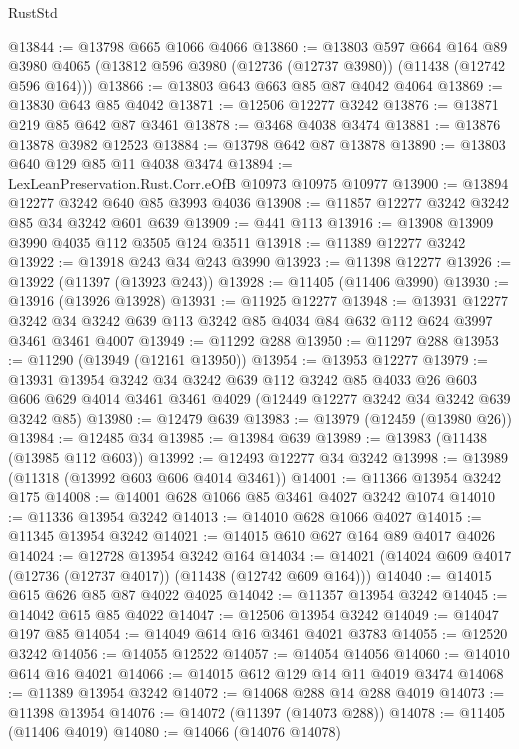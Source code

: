 \begin{lexlean}{RustStd}
\begin{coremodule}
@13844 := @13798 @665 @1066 @4066
@13860 := @13803
    @597
    @664
    @164
    @89
    @3980
    @4065
    (@13812 @596 @3980 (@12736 (@12737 @3980)) (@11438 (@12742 @596 @164)))
@13866 := @13803 @643 @663 @85 @87 @4042 @4064
@13869 := @13830 @643 @85 @4042
@13871 := @12506 @12277 @3242
@13876 := @13871 @219 @85 @642 @87 @3461
@13878 := @3468 @4038 @3474
@13881 := @13876 @13878 @3982 @12523
@13884 := @13798 @642 @87 @13878
@13890 := @13803 @640 @129 @85 @11 @4038 @3474
@13894 := LexLeanPreservation.Rust.Corr.eOfB @10973 @10975 @10977
@13900 := @13894 @12277 @3242 @640 @85 @3993 @4036
@13908 := @11857 @12277 @3242 @3242 @85 @34 @3242 @601 @639
@13909 := @441 @113
@13916 := @13908 @13909 @3990 @4035 @112 @3505 @124 @3511
@13918 := @11389 @12277 @3242
@13922 := @13918 @243 @34 @243 @3990
@13923 := @11398 @12277
@13926 := @13922 (@11397 (@13923 @243))
@13928 := @11405 (@11406 @3990)
@13930 := @13916 (@13926 @13928)
@13931 := @11925 @12277
@13948 := @13931
    @12277
    @3242
    @34
    @3242
    @639
    @113
    @3242
    @85
    @4034
    @84
    @632
    @112
    @624
    @3997
    @3461
    @3461
    @4007
@13949 := @11292 @288
@13950 := @11297 @288
@13953 := @11290 (@13949 (@12161 @13950))
@13954 := @13953 @12277
@13979 := @13931
    @13954
    @3242
    @34
    @3242
    @639
    @112
    @3242
    @85
    @4033
    @26
    @603
    @606
    @629
    @4014
    @3461
    @3461
    @4029
    (@12449 @12277 @3242 @34 @3242 @639 @3242 @85)
@13980 := @12479 @639
@13983 := @13979 (@12459 (@13980 @26))
@13984 := @12485 @34
@13985 := @13984 @639
@13989 := @13983 (@11438 (@13985 @112 @603))
@13992 := @12493 @12277 @34 @3242
@13998 := @13989 (@11318 (@13992 @603 @606 @4014 @3461))
@14001 := @11366 @13954 @3242 @175
@14008 := @14001 @628 @1066 @85 @3461 @4027 @3242 @1074
@14010 := @11336 @13954 @3242
@14013 := @14010 @628 @1066 @4027
@14015 := @11345 @13954 @3242
@14021 := @14015 @610 @627 @164 @89 @4017 @4026
@14024 := @12728 @13954 @3242 @164
@14034 := @14021 (@14024 @609 @4017 (@12736 (@12737 @4017)) (@11438 (@12742 @609 @164)))
@14040 := @14015 @615 @626 @85 @87 @4022 @4025
@14042 := @11357 @13954 @3242
@14045 := @14042 @615 @85 @4022
@14047 := @12506 @13954 @3242
@14049 := @14047 @197 @85
@14054 := @14049 @614 @16 @3461 @4021 @3783
@14055 := @12520 @3242
@14056 := @14055 @12522
@14057 := @14054 @14056
@14060 := @14010 @614 @16 @4021
@14066 := @14015 @612 @129 @14 @11 @4019 @3474
@14068 := @11389 @13954 @3242
@14072 := @14068 @288 @14 @288 @4019
@14073 := @11398 @13954
@14076 := @14072 (@11397 (@14073 @288))
@14078 := @11405 (@11406 @4019)
@14080 := @14066 (@14076 @14078)

\end{coremodule}
\end{lexlean}
